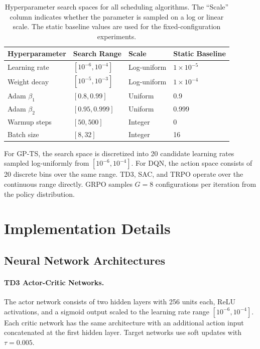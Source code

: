 \documentclass[11pt]{article}
\begin{document}
\begin{table}[h!]
\centering
\small
\begin{tabular}{@{}llll@{}}
\toprule
\textbf{Hyperparameter} & \textbf{Search Range} & \textbf{Scale} & \textbf{Static Baseline} \\
\midrule
Learning rate & $[10^{-6}, 10^{-4}]$ & Log-uniform & $1 \times 10^{-5}$ \\
Weight decay & $[10^{-5}, 10^{-3}]$ & Log-uniform & $1 \times 10^{-4}$ \\
Adam $\beta_1$ & $[0.8, 0.99]$ & Uniform & 0.9 \\
Adam $\beta_2$ & $[0.95, 0.999]$ & Uniform & 0.999 \\
Warmup steps & $[50, 500]$ & Integer & 0 \\
Batch size & $[8, 32]$ & Integer & 16 \\
\bottomrule
\end{tabular}
\caption{Hyperparameter search spaces for all scheduling algorithms. The ``Scale'' column indicates whether the parameter is sampled on a log or linear scale. The static baseline values are used for the fixed-configuration experiments.}
\label{tab:search-spaces}
\end{table}

For GP-TS, the search space is discretized into 20 candidate learning rates sampled log-uniformly from $[10^{-6}, 10^{-4}]$. For DQN, the action space consists of 20 discrete bins over the same range. TD3, SAC, and TRPO operate over the continuous range directly. GRPO samples $G=8$ configurations per iteration from the policy distribution.

\section{Implementation Details}
\label{sec:implementation}

\subsection{Neural Network Architectures}

\paragraph{TD3 Actor-Critic Networks.} The actor network consists of two hidden layers with 256 units each, ReLU activations, and a sigmoid output scaled to the learning rate range $[10^{-6}, 10^{-4}]$. Each critic network has the same architecture with an additional action input concatenated at the first hidden layer. Target networks use soft updates with $\tau = 0.005$.
\end{document}
